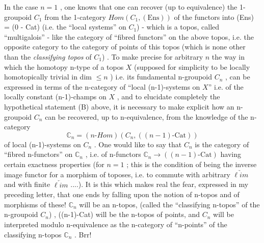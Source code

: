 \documentclass[11pt]{article}
\begin{document}
In the case $n = 1$ , one knows that one can recover (up to equivalence)
the 1-groupoid $C_1$ from the 1-category $\mathit{Hom}(C_1, (\mathrm{Ens}))$ of the functors into
(Ens) = (0 - Cat) (i.e. the ``local systems'' on $C_1$) - which is a topos, called
``multigalois'' - like the category of ``fibred functors'' on the above topos,
i.e. the opposite category to the category of points of this topos (which
is none other than the \textit{classifying topos} of $C_1$) . To make precise for
arbitrary $n$ the way in which the homotopy n-type of a topos $X$ (supposed
for simplicity to be locally homotopically trivial in dim $\leq n$ ) i.e. its
fundamental n-groupoid $C_n$ , can be expressed in terms of the n-category of
``local (n-1)-systems on $X$'' i.e. of the locally constant (n-1)-champs on $X$ ,
and to elucidate completely the hypothetical statement (B) above, it is
necessary to make explicit how an n-groupoid $C_n$ can be recovered, up to
n-equivalence, from the knowledge of the n-category
\[ \mathbb{C}_n = (n\text{-}\mathit{Hom})(C_n , ((n-1)\text{-}\mathrm{Cat})) \]
of local (n-1)-systems on $C_n$ . One would like to say that $C_n$ is the category
of ``fibred n-functors'' on $\mathbb{C}_n$ , i.e. of n-functors $\mathbb{C}_n \rightarrow ((n-1)\text{-}\mathrm{Cat})$ having
certain exactness properties (for $n = 1$ ; this is the condition of being
the inverse image functor for a morphism of toposes, i.e. to commute with
arbitrary $\underrightarrow{\ell im}$ and with finite $\underleftarrow{\ell im}$ ....). It is this which makes real
the fear, expressed in my preceding letter, that one ends by falling upon
the notion of n-topos and of morphisms of these! $\mathbb{C}_n$ will be an n-topos,
(called the ``classifying n-topos'' of the n-groupoid $C_n$) , ((n-1)-Cat) will
be the n-topos of points, and $C_n$ will be interpreted modulo n-equivalence
as the n-category of ``n-points'' of the classifying n-topos $\mathbb{C}_n$ . Brr!
\end{document}
